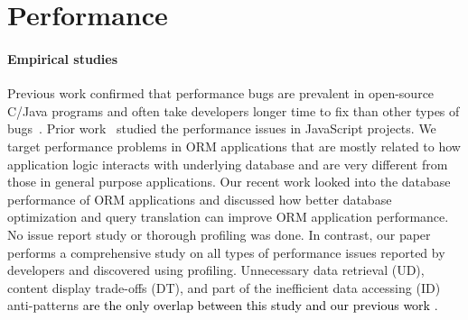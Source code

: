 \vspace{-0.05in}
\section{Performance}
\label{sec:related}

\vspace{-0.025in}
\paragraph{\bf{Empirical studies}}
Previous work confirmed that performance bugs are prevalent in open-source C/Java programs
and often take developers longer time to fix than other types of bugs~\cite{song.pldi12, zaman.msr12}. Prior work~\cite{mark:se17:javascript} studied the performance issues in JavaScript projects. We target performance problems in ORM applications that are mostly related to how application logic interacts with underlying database and are very different from those in general purpose applications. 
Our recent work \cite{yan:cikm17} looked into the database performance of ORM applications and discussed how better database optimization and query translation can improve ORM application performance. No issue report study or thorough profiling was done. In contrast, our paper performs a comprehensive study on all types of performance issues reported by developers and discovered using profiling. Unnecessary data retrieval (UD), content display trade-offs (DT), and part of the inefficient data accessing (ID) anti-patterns \textcolor{black}{ are the only overlap between this study and our previous work \cite{yan:cikm17} }.

\vspace{-0.08in} 
